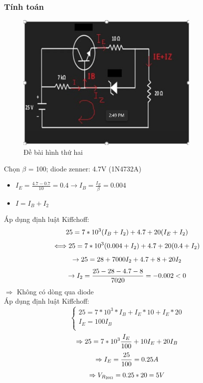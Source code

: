     \subsubsection{Tính toán}
    \begin{figure}[H]
        \centering
        \includegraphics[width=0.8\textwidth]{pictures/pic5_b.png}
        \caption{Đề bài hình thứ hai}
    \end{figure}
    Chọn $\beta$ = 100; diode zenner: 4.7V (1N4732A)
    \begin{itemize}
        \item $I_E = \frac{4.7 - 0.7}{10} = 0.4 \rightarrow I_B = \frac{I_E}{\beta} = 0.004$
        \item $I = I_B + I_2$
    \end{itemize}
    Áp dụng định luật Kiffchoff:
    \[
        25 = 7*10^3(I_B + I_2) + 4.7 + 20(I_E + I_2)\\
    \]
    \[
        \Longleftrightarrow 25 = 7*10^3(0.004 + I_2) + 4.7 + 20(0.4 + I_2) \\
    \]
    \[
        \rightarrow 25 = 28 + 7000I_2 + 4.7 + 8 + 20I_2 \\
    \]
    \[
        \rightarrow I_2 = \frac{25 - 28 - 4.7 - 8}{7020} = -0.002 < 0\\
    \]
    $\Rightarrow$ Không có dòng qua diode\\
    Áp dụng định luật Kiffchoff:
    \[
    \begin{cases}
        25 = 7*10^3*I_B + I_E*10 + I_E*20\\
        I_E = 100I_B\\
    \end{cases} 
    \]
    \[
    \Rightarrow 25 =7*10^3\frac{I_E}{100} + 10I_E + 20 I_B\\
    \]
    \[
    \Rightarrow I_E = \frac{25}{100} = 0.25 A\\
    \]
    \[
    \Rightarrow V_{R_{20\Omega }} = 0.25*20 = 5V\\
    \]
